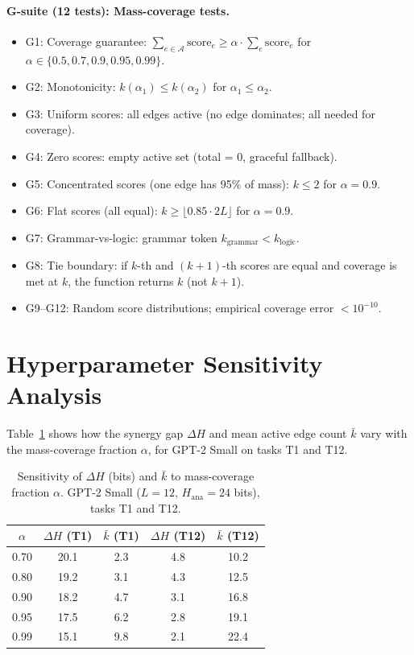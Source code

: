 \documentclass{article}
\newcommand{\Acal}{\mathcal{A}}
\newcommand{\Hana}{H_{\mathrm{ana}}}
\newcommand{\DeltaH}{\Delta H}
\newcommand{\score}{\mathrm{score}}
\begin{document}
\paragraph{G-suite (12 tests): Mass-coverage tests.}
\begin{itemize}
  \item G1: Coverage guarantee: $\sum_{e \in \Acal} \score_e \geq \alpha \cdot \sum_e \score_e$
        for $\alpha \in \{0.5, 0.7, 0.9, 0.95, 0.99\}$.
  \item G2: Monotonicity: $k(\alpha_1) \leq k(\alpha_2)$ for $\alpha_1 \leq \alpha_2$.
  \item G3: Uniform scores: all edges active (no edge dominates; all needed for coverage).
  \item G4: Zero scores: empty active set (total = 0, graceful fallback).
  \item G5: Concentrated scores (one edge has 95\% of mass): $k \leq 2$ for $\alpha=0.9$.
  \item G6: Flat scores (all equal): $k \geq \lfloor 0.85 \cdot 2L \rfloor$ for $\alpha=0.9$.
  \item G7: Grammar-vs-logic: grammar token $k_{\mathrm{grammar}} < k_{\mathrm{logic}}$.
  \item G8: Tie boundary: if $k$-th and $(k+1)$-th scores are equal and coverage is met at $k$,
        the function returns $k$ (not $k+1$).
  \item G9--G12: Random score distributions; empirical coverage error $< 10^{-10}$.
\end{itemize}

\section{Hyperparameter Sensitivity Analysis}
\label{app:sensitivity}

Table~\ref{tab:sensitivity} shows how the synergy gap $\DeltaH$ and mean active edge
count $\bar k$ vary with the mass-coverage fraction $\alpha$, for GPT-2 Small on
tasks T1 and T12.

\begin{table}[h]
  \centering
  \caption{Sensitivity of $\DeltaH$ (bits) and $\bar k$ to mass-coverage fraction $\alpha$.
  GPT-2 Small ($L=12$, $\Hana=24$ bits), tasks T1 and T12.}
  \label{tab:sensitivity}
  \begin{tabular}{ccccc}
    \toprule
    $\alpha$ & $\DeltaH$ (T1) & $\bar k$ (T1) & $\DeltaH$ (T12) & $\bar k$ (T12) \\
    \midrule
    0.70 & 20.1 & 2.3 & 4.8 & 10.2 \\
    0.80 & 19.2 & 3.1 & 4.3 &  12.5 \\
    0.90 & 18.2 & 4.7 & 3.1 &  16.8 \\
    0.95 & 17.5 & 6.2 & 2.8 &  19.1 \\
    0.99 & 15.1 & 9.8 & 2.1 &  22.4 \\
    \bottomrule
  \end{tabular}
\end{table}
\end{document}
